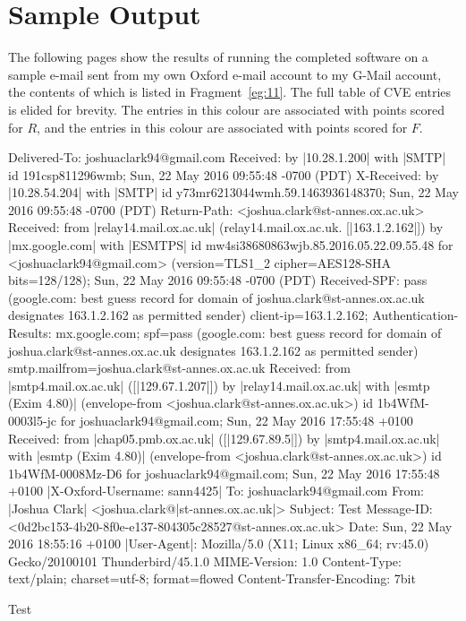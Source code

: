 \section{Sample Output}

The following pages show the results of running the completed software on a
sample e-mail sent from my own Oxford e-mail account to my G-Mail account, the
contents of which is listed in Fragment~\ref{eg:11}.  The full table of CVE
entries is elided for brevity.  The entries in \colorbox{red!30}{this colour}
are associated with points scored for $R$, and the entries in
\colorbox{blue!30}{this colour} are associated with points scored for $F$.

\begin{example}[caption=Sample E-Mail,label=eg:11]
Delivered-To: joshuaclark94@gmail.com
Received: by |\colorbox{red!30}{10.28.1.200}| with |\colorbox{red!30}{SMTP}| id 191csp811296wmb;
        Sun, 22 May 2016 09:55:48 -0700 (PDT)
X-Received: by |\colorbox{red!30}{10.28.54.204}| with |\colorbox{red!30}{SMTP}| id y73mr6213044wmh.59.1463936148370;
        Sun, 22 May 2016 09:55:48 -0700 (PDT)
Return-Path: <joshua.clark@st-annes.ox.ac.uk>
Received: from |\colorbox{red!30}{relay14.mail.ox.ac.uk}| (relay14.mail.ox.ac.uk. [|\colorbox{red!30}{163.1.2.162}|])
        by |\colorbox{red!30}{mx.google.com}| with |\colorbox{red!30}{ESMTPS}| id mw4si38680863wjb.85.2016.05.22.09.55.48
        for <joshuaclark94@gmail.com>
        (version=TLS1_2 cipher=AES128-SHA bits=128/128);
        Sun, 22 May 2016 09:55:48 -0700 (PDT)
Received-SPF: pass (google.com: best guess record for domain of joshua.clark@st-annes.ox.ac.uk designates 163.1.2.162 as permitted sender) client-ip=163.1.2.162;
Authentication-Results: mx.google.com;
       spf=pass (google.com: best guess record for domain of joshua.clark@st-annes.ox.ac.uk designates 163.1.2.162 as permitted sender) smtp.mailfrom=joshua.clark@st-annes.ox.ac.uk
Received: from |\colorbox{red!30}{smtp4.mail.ox.ac.uk}| ([|\colorbox{red!30}{129.67.1.207}|])
	by |\colorbox{red!30}{relay14.mail.ox.ac.uk}| with |\colorbox{red!30}{esmtp (Exim 4.80)}|
	(envelope-from <joshua.clark@st-annes.ox.ac.uk>) id 1b4WfM-0003l5-jc
	for joshuaclark94@gmail.com; Sun, 22 May 2016 17:55:48 +0100
Received: from |\colorbox{red!30}{chap05.pmb.ox.ac.uk}| ([|\colorbox{red!30}{129.67.89.5}|])
	by |\colorbox{red!30}{smtp4.mail.ox.ac.uk}| with |\colorbox{red!30}{esmtp (Exim 4.80)}|
	(envelope-from <joshua.clark@st-annes.ox.ac.uk>) id 1b4WfM-0008Mz-D6
	for joshuaclark94@gmail.com; Sun, 22 May 2016 17:55:48 +0100
|\colorbox{blue!30}{X-Oxford-Username: sann4425}|
To: joshuaclark94@gmail.com
From: |\colorbox{blue!30}{Joshua Clark}| <joshua.clark@|\colorbox{blue!30}{st-annes.ox.ac.uk}|>
Subject: Test
Message-ID: <0d2bc153-4b20-8f0e-e137-804305c28527@st-annes.ox.ac.uk>
Date: Sun, 22 May 2016 18:55:16 +0100
|\colorbox{blue!30}{User-Agent}|: Mozilla/5.0 (X11; Linux x86_64; rv:45.0) Gecko/20100101
 Thunderbird/45.1.0
MIME-Version: 1.0
Content-Type: text/plain; charset=utf-8; format=flowed
Content-Transfer-Encoding: 7bit

Test
\end{example}

